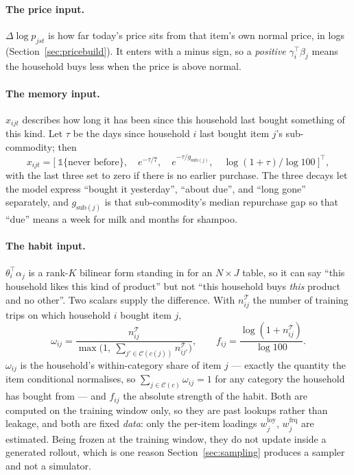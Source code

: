 \documentclass[11pt]{article}
\begin{document}
\paragraph{The price input.} $\Delta\log p_{jst}$ is how far today's price sits from that
item's own normal price, in logs (Section~\ref{sec:pricebuild}). It enters with a minus
sign, so a \emph{positive} $\gamma_i^{\top}\beta_j$ means the household buys less when the
price is above normal.

\paragraph{The memory input.} $x_{ijt}$ describes how long it has been since this
household last bought something of this kind. Let $\tau$ be the days since household $i$
last bought item $j$'s sub-commodity; then
\begin{equation}
x_{ijt}=\bigl[\ \mathbb 1\{\text{never before}\},\quad e^{-\tau/7},\quad
e^{-\tau/g_{\mathrm{sub}(j)}},\quad \log(1+\tau)/\log 100\ \bigr]^{\top},
\end{equation}
with the last three set to zero if there is no earlier purchase. The three decays let the
model express ``bought it yesterday'', ``about due'', and ``long gone'' separately, and
$g_{\mathrm{sub}(j)}$ is that sub-commodity's median repurchase gap so that ``due'' means
a week for milk and months for shampoo.

\paragraph{The habit input.} $\theta_i^{\top}\alpha_j$ is a rank-$K$ bilinear form standing
in for an $N\times J$ table, so it can say ``this household likes this kind of product'' but
not ``this household buys \emph{this} product and no other''. Two scalars supply the
difference. With $n^{\mathcal T}_{ij}$ the number of training trips on which household $i$
bought item $j$,
\begin{equation}
\omega_{ij}=\frac{n^{\mathcal T}_{ij}}
{\max\bigl(1,\ \sum_{j'\in\mathcal{C}(c(j))}n^{\mathcal T}_{ij'}\bigr)},
\qquad
f_{ij}=\frac{\log(1+n^{\mathcal T}_{ij})}{\log 100}.
\label{eq:persist}
\end{equation}
$\omega_{ij}$ is the household's within-category share of item $j$ --- exactly the quantity
the item conditional normalises, so $\sum_{j\in\mathcal{C}(c)}\omega_{ij}=1$ for any
category the household has bought from --- and $f_{ij}$ the absolute strength of the habit.
Both are computed on the training window only, so they are past lookups rather than leakage,
and both are fixed \emph{data}: only the per-item loadings $w^{\mathrm{loy}}_j$,
$w^{\mathrm{frq}}_j$ are estimated. Being frozen at the training window, they do not update
inside a generated rollout, which is one reason Section~\ref{sec:sampling} produces a sampler
and not a simulator.
\end{document}
